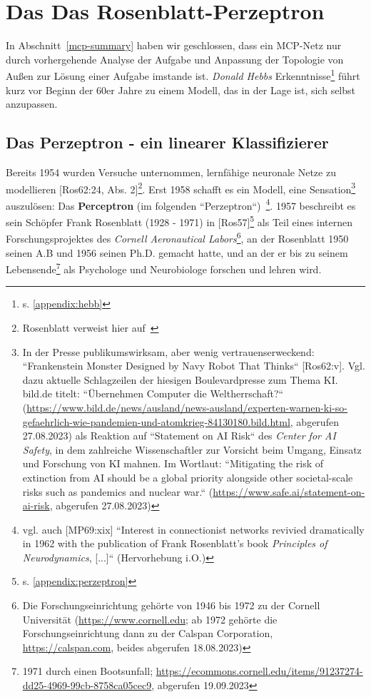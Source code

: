 \section{Das Das Rosenblatt-Perzeptron}

In Abschnitt~\ref{mcp-summary} haben wir geschlossen, dass ein MCP-Netz nur durch vorhergehende Analyse der Aufgabe und Anpassung der Topologie von Außen zur Lösung einer Aufgabe imstande ist.
\textit{Donald Hebbs} Erkenntnisse\footnote{
    s. \ref{appendix:hebb}
} führt kurz vor Beginn der 60er Jahre zu einem Modell, das in der Lage ist, sich selbst anzupassen.


\subsection{Das Perzeptron - ein linearer Klassifizierer}

Bereits 1954 wurden Versuche unternommen, lernfähige neuronale Netze zu modellieren [Ros62:24, Abs. 2]\footnote{
    Rosenblatt verweist hier auf~\cite{FC54}
}.
Erst 1958 schafft es ein Modell, eine Sensation\footnote{
    In der Presse publikumswirksam, aber wenig vertrauenserweckend: ``Frankenstein Monster Designed by Navy Robot That Thinks`` [Ros62:v]. Vgl. dazu aktuelle Schlagzeilen der hiesigen Boulevardpresse zum Thema KI. bild.de titelt: ``Übernehmen Computer die Weltherrschaft?`` (\url{https://www.bild.de/news/ausland/news-ausland/experten-warnen-ki-so-gefaehrlich-wie-pandemien-und-atomkrieg-84130180.bild.html}, abgerufen 27.08.2023) als Reaktion auf ``Statement on AI Risk`` des \textit{Center for AI Safety}, in dem zahlreiche Wissenschaftler zur Vorsicht beim Umgang, Einsatz und Forschung von KI mahnen. Im Wortlaut: ``Mitigating the risk of extinction from AI should be a global priority alongside other societal-scale risks such as pandemics and nuclear war.`` (\url{https://www.safe.ai/statement-on-ai-risk}, abgerufen 27.08.2023)
} auszulösen: Das \textbf{Perceptron} (im folgenden ``Perzeptron``)~\cite[89]{AR88}\footnote{
    vgl. auch [MP69:xix] ``Interest in connectionist networks revivied dramatically in 1962 with the publication of Frank Rosenblatt's book \textit{Principles of Neurodynamics}, [...]`` (Hervorhebung i.O.)
}.
1957 beschreibt es sein Schöpfer Frank Rosenblatt (1928 - 1971) in [Ros57]\footnote{
    s. \ref{appendix:perzeptron}
} als Teil eines internen Forschungsprojektes des \textit{Cornell Aeronautical Labors}\footnote{
    Die Forschungseinrichtung gehörte von 1946 bis 1972 zu der Cornell Universität (\url{https://www.cornell.edu}; ab 1972 gehörte die Forschungseinrichtung dann zu der Calspan Corporation, \url{https://calspan.com}, beides abgerufen 18.08.2023)
}, an der Rosenblatt 1950 seinen A.B und 1956 seinen Ph.D. gemacht hatte, und an der er bis zu seinem Lebensende\footnote{
    1971 durch einen Bootsunfall; \url{https://ecommons.cornell.edu/items/91237274-dd25-4969-99cb-8758ca05cec9}, abgerufen 19.09.2023
} als Psychologe und Neurobiologe forschen und lehren wird.


